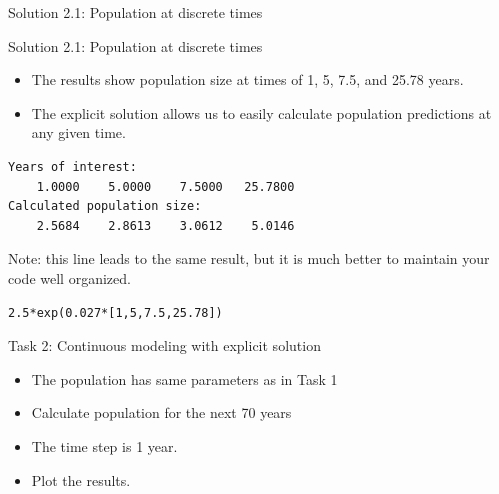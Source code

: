 \begin{frame}[fragile]{Solution 2.1: Population at discrete times}

\small

\end{frame}

\begin{frame}[fragile]{Solution 2.1: Population at discrete times}
\begin{itemize}
    \item The results show population size at times of 1, 5, 7.5, and 25.78 years.
    \item The explicit solution allows us to easily calculate population predictions at any given time.  
\end{itemize}

\vfill 
\small
\begin{lstlisting}
Years of interest:
    1.0000    5.0000    7.5000   25.7800
Calculated population size:
    2.5684    2.8613    3.0612    5.0146
\end{lstlisting}

\vfill
Note: this line leads to the same result, but it is much better to maintain your code well organized. 
\begin{lstlisting}
2.5*exp(0.027*[1,5,7.5,25.78])
\end{lstlisting}

\end{frame}


\begin{frame}{Task 2: Continuous modeling with explicit solution }
\begin{itemize}
    \item The population has same parameters as in Task 1
    \item Calculate population for the next 70 years 
    \item The time step is 1 year.
    \item Plot the results.
\end{itemize}
\end{frame}

